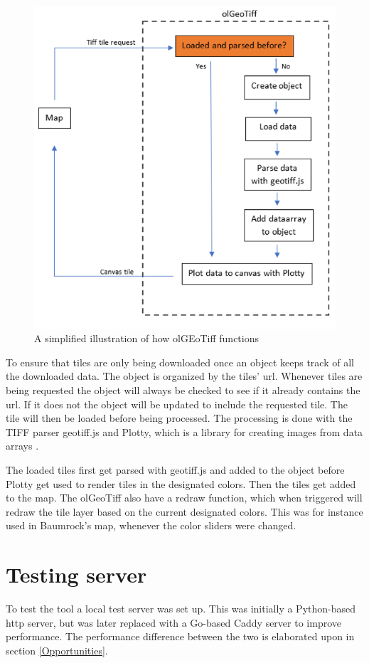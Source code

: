 \begin{figure} [H]
	\centering
	\includegraphics[width=.8\textwidth]{Pictures/olGeoTiffSimplified}
	\caption{A simplified illustration of how olGEoTiff functions}
	\label{olGeoTiffSimplified}
\end{figure}

To ensure that tiles are only being downloaded once an object keeps track of all the downloaded data. The object is organized by the tiles’ url. 
Whenever tiles are being requested the object will always be checked to see if it already contains the url. If it does not the object will be updated to include the requested tile. The tile will then be loaded before being processed. \citep{Baumrocks}
The processing is done with the TIFF parser geotiff.js 
\citep{Geotiff}
and Plotty, which is a library for creating images from data arrays \citep{Plotty}.

The loaded tiles first get parsed with geotiff.js and added to the object before Plotty get used to render tiles in the designated colors. Then the tiles get added to the map.
\citep{Baumrocks}
The olGeoTiff also have a redraw function, which when triggered will redraw the tile layer based on the current designated colors. This was for instance used in Baumrock's map, whenever the color sliders were changed. 

\section{Testing server}\label{Caddy}
To test the tool a local test server was set up. This was initially a Python-based http server, but was later replaced with a Go-based Caddy server to improve performance. The performance difference between the two is elaborated upon in section \ref{Opportunities}.

